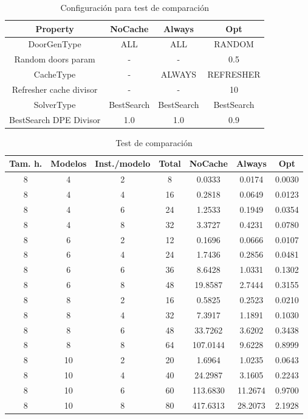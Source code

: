 \begin{table}[H]
\begin{center}
	\begin{tabular}{ | c | c | c | c | }
\hline
Property & NoCache & Always & Opt \\ \hline
DoorGenType & ALL & ALL & RANDOM \\
Random doors param & - & - & 0.5 \\
CacheType & - & ALWAYS & REFRESHER \\
Refresher cache divisor & - & - & 10 \\
SolverType & BestSearch & BestSearch & BestSearch \\
BestSearch DPE Divisor & 1.0 & 1.0 & 0.9 \\
\hline
	\end{tabular}
\end{center}
\caption{Configuración para test de comparación}
\label{table:cfg-comp}
\end{table}


\begin{table}[H]
\begin{center}
	\begin{tabular}{ | c | c | c | c | c | c | c | }
\hline
Tam. h. & Modelos & Inst./modelo & Total & NoCache & Always & Opt \\ \hline 
8 & 4 & 2 & 8 & 0.0333 & 0.0174 & 0.0030 \\ 
8 & 4 & 4 & 16 & 0.2818 & 0.0649 & 0.0123 \\ 
8 & 4 & 6 & 24 & 1.2533 & 0.1949 & 0.0354 \\ 
8 & 4 & 8 & 32 & 3.3727 & 0.4231 & 0.0780 \\ 
8 & 6 & 2 & 12 & 0.1696 & 0.0666 & 0.0107 \\ 
8 & 6 & 4 & 24 & 1.7436 & 0.2856 & 0.0481 \\ 
8 & 6 & 6 & 36 & 8.6428 & 1.0331 & 0.1302 \\ 
8 & 6 & 8 & 48 & 19.8587 & 2.7444 & 0.3155 \\ 
8 & 8 & 2 & 16 & 0.5825 & 0.2523 & 0.0210 \\ 
8 & 8 & 4 & 32 & 7.3917 & 1.1891 & 0.1030 \\ 
8 & 8 & 6 & 48 & 33.7262 & 3.6202 & 0.3438 \\ 
8 & 8 & 8 & 64 & 107.0144 & 9.6228 & 0.8999 \\ 
8 & 10 & 2 & 20 & 1.6964 & 1.0235 & 0.0643 \\
8 & 10 & 4 & 40 & 24.2987 & 3.1605 & 0.2243 \\
8 & 10 & 6 & 60 & 113.6830 & 11.2674 & 0.9700 \\
8 & 10 & 8 & 80 & 417.6313 & 28.2073 & 2.1928 \\
\hline
	\end{tabular}
\end{center}
\caption{Test de comparación}
\label{table:comp}
\end{table}


